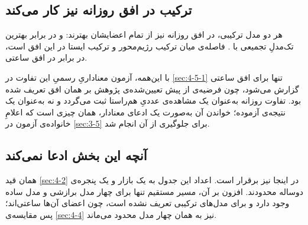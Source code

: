 \subsection*{ترکیب در افق روزانه نیز کار می‌کند}

هر دو مدل ترکیبی، در افق روزانه نیز از تمام اعضایشان بهترند:  و
 در برابر بهترین تک‌مدلِ تجمیعی با . فاصله‌ی میان ترکیب
رژیم‌محور و ترکیب ایستا در این افق  است، در برابر  در افق
ساعتی.

با این‌همه، آزمون معناداریِ رسمیِ این تفاوت در \cref{sec:4-5-1} تنها برای افق ساعتی گزارش
می‌شود، چون فرضیه‌ی از پیش تعیین‌شده‌ی پژوهش بر همان افق تعریف شده بود. تفاوت روزانه
به‌عنوان یک مشاهده‌ی عددیِ هم‌راستا ثبت می‌گردد و نه به‌عنوان یک نتیجه‌ی آزموده؛ خواندن
آن به‌صورت یک ادعای معنادار، همان چیزی است که اعلامِ خانواده‌ی آزمون در \cref{sec:3-5} برای
جلوگیری از آن انجام شد.

\subsection*{آنچه این بخش ادعا نمی‌کند}

همان قید \cref{sec:4-2} در اینجا نیز برقرار است. اعداد این جدول به یک بازار و یک پنجره‌ی
دوساله محدودند. افزون بر آن، مسیر مستقیم تنها برای چهار مدل برازشی و مدل ساده وجود
دارد و برای مدل‌های ترکیبی تعریف نشده است، چون اعضای آن‌ها ساعتی‌اند؛ پس مقایسه‌ی \cref{sec:4-4} نیز به همان چهار مدل محدود می‌ماند.
